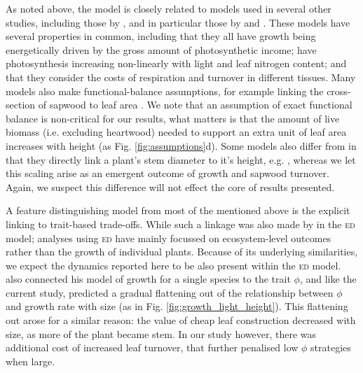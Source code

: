 \documentclass[a4paper,11pt]{article}
\begin{document}
As noted above, the {\plant} model is closely related to models used in several other studies, including those by \citet{Givnish-1988, Yokozawa-1995, Makela-1997, King-1999, King-2005, Moorcroft-2001, Li-2014}, and in particular those by \citet{Makela-1997} and \citet{Moorcroft-2001}. These models have several properties in common, including that they all have growth being energetically driven by the gross amount of photosynthetic income; have photosynthesis increasing non-linearly with light and leaf nitrogen content; and that they consider the costs of respiration and turnover in different tissues. Many models also make functional-balance assumptions, for example linking the cross-section of sapwood to leaf area \citep{Givnish-1988, Yokozawa-1995, Makela-1997, King-2005, Moorcroft-2001}. We note that an assumption of exact functional balance is non-critical for our results, what matters is that the amount of live biomass (i.e. excluding heartwood) needed to support an extra unit of leaf area increases with height (as Fig. \ref{fig:assumptions}d). Some models also differ from in that they directly link a plant's stem diameter to it's height, e.g. \citet{Yokozawa-1995, King-1999, Moorcroft-2001, Li-2014}, whereas we let this scaling arise as an emergent outcome of growth and sapwood turnover. Again, we suspect this difference will not effect the core of results presented.

A feature distinguishing model from most of the mentioned above is the explicit linking to trait-based trade-offs. While such a linkage was also made by \citet{Moorcroft-2001} in the \textsc{ed} model; analyses using \textsc{ed} have mainly focussed on ecosystem-level outcomes rather than the growth of individual plants. Because of its underlying similarities, we expect the dynamics reported here to be also present within the \textsc{ed} model. \citet{King-1999} also connected his model of growth for a single species to the trait $\phi$, and like the current study, predicted a gradual flattening out of the relationship between $\phi$ and growth rate with size (as in Fig. \ref{fig:growth_light_height}). This flattening out arose for a similar reason: the value of cheap leaf construction decreased with size, as more of the plant became stem. In our study however, there was additional cost of increased leaf turnover, that further penalised low $\phi$ strategies when large.
\end{document}
